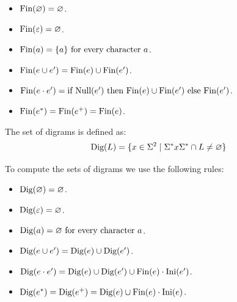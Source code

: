 \begin{itemize}
    \item $\textnormal{Fin}(\varnothing)=\varnothing$.                                                                                                         
    \item $\textnormal{Fin}(\varepsilon)=\varnothing$.                                                                                                         
    \item $\textnormal{Fin}(a)=\{a\} \textnormal{ for every character }a$.                                                                                     
    \item $\textnormal{Fin}(e \cup e^{\prime})=\textnormal{Fin}(e) \cup \textnormal{Fin}(e^{\prime})$.                                                                   
    \item $\textnormal{Fin}(e \cdot e^{\prime})=\textnormal{if Null}(e^{\prime}) \textnormal{ then Fin}(e)\cup\textnormal{Fin}(e^{\prime}) \textnormal{ else Fin}(e^{\prime})$.    
    \item $\textnormal{Fin}(e^{\ast})=\textnormal{Fin}(e^{+})=\textnormal{Fin}(e)$.                                                                               
\end{itemize}
\begin{definition}
    The set of digrams is defined as: 
    \[\textnormal{Dig}(L)=\{x \in \Sigma^{2} \mid  \Sigma^{\ast}x\Sigma^{\ast} \cap L \neq \varnothing\}\]
\end{definition}
To compute the sets of digrams we use the following rules: 
\begin{itemize}
    \item $\textnormal{Dig}(\varnothing)=\varnothing$.                                                                                                     
    \item $\textnormal{Dig}(\varepsilon)=\varnothing$.                                                                                                       
    \item $\textnormal{Dig}(a)=\varnothing \textnormal{ for every character }a$.                                                                                   
    \item $\textnormal{Dig}(e \cup e^{\prime})=\textnormal{Dig}(e) \cup \textnormal{Dig}(e^{\prime})$.                                                                 
    \item $\textnormal{Dig}(e \cdot e^{\prime})=\textnormal{Dig}(e) \cup \textnormal{Dig}(e^{\prime}) \cup \textnormal{Fin}(e) \cdot \textnormal{Ini}(e^{\prime})$.    
    \item $\textnormal{Dig}(e^{\ast})=\textnormal{Dig}(e^{+})=\textnormal{Dig}(e) \cup \textnormal{Fin}(e) \cdot \textnormal{Ini}(e)$.                                                                 
\end{itemize}
